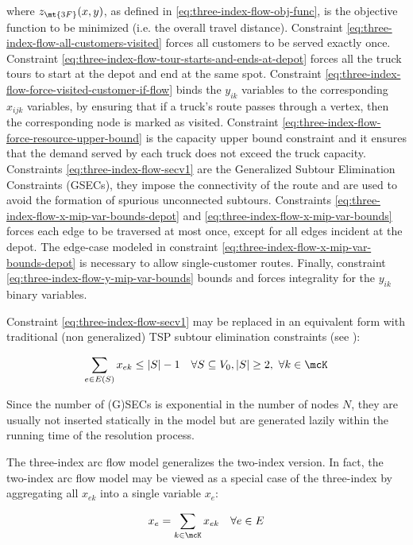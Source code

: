 where $z_\mt{3F}(x, y)$, as defined in \eqref{eq:three-index-flow-obj-func}, is the objective function to be minimized (i.e. the overall travel distance).
Constraint \eqref{eq:three-index-flow-all-customers-visited} forces all customers to be served exactly once.
Constraint \eqref{eq:three-index-flow-tour-starts-and-ends-at-depot} forces all the truck tours to start at the depot and end at the same spot.
Constraint \eqref{eq:three-index-flow-force-visited-customer-if-flow} binds the $y_{ik}$ variables to the corresponding $x_{ijk}$ variables, by ensuring that if a truck's route passes through a vertex, then the corresponding node is marked as visited.
Constraint \eqref{eq:three-index-flow-force-resource-upper-bound} is the capacity upper bound constraint and it ensures that the demand served by each truck does not exceed the truck capacity.
Constraints \eqref{eq:three-index-flow-secv1} are the Generalized Subtour Elimination Constraints (GSECs), they impose the connectivity of the route and are used to avoid the formation of spurious unconnected subtours.
Constraints \eqref{eq:three-index-flow-x-mip-var-bounds-depot} and \eqref{eq:three-index-flow-x-mip-var-bounds} forces each edge to be traversed at most once,
except for all edges incident at the depot.
The edge-case modeled in constraint \eqref{eq:three-index-flow-x-mip-var-bounds-depot}
is necessary to allow single-customer routes.
Finally, constraint \eqref{eq:three-index-flow-y-mip-var-bounds}
bounds and forces integrality for the $y_{ik}$ binary variables.

Constraint \eqref{eq:three-index-flow-secv1} may be replaced in an equivalent form
with traditional (non generalized) TSP subtour elimination constraints (see \textcite{fisher1981}):

\begin{equation}\label{eq:three-index-flow-secv2}
	\sum_{e \in E(S)} x_{ek} \le |S| - 1 \quad \forall S \subseteq V_0, |S| \ge 2,\ \forall k \in \mcK
\end{equation}

Since the number of (G)SECs is exponential in the number of nodes $N$, they are usually not inserted statically in the model but are generated lazily within the running time of the resolution process.

The three-index arc flow model generalizes the two-index version.
In fact, the two-index arc flow model may be viewed as a special case of the three-index by aggregating
all $x_{ek}$ into a single variable $x_e$:


\begin{equation}
	x_e = \sum_{k \in \mcK} x_{ek} \quad \forall e \in E
\end{equation}

